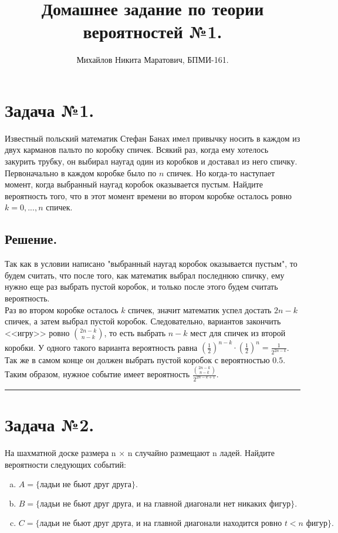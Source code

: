 \documentclass[a4paper, 12pt]{article}
\title{
	Домашнее задание по теории вероятностей №1.
}
\author{Михайлов Никита Маратович, БПМИ-161.
}
\date{}
\newcommand{\D}{\displaystyle}
\begin{document}
\maketitle
\begin{spacing}{1}
		
\section{Задача №1.} 
Известный польский математик Стефан Банах имел привычку носить в каждом из двух карманов пальто по коробку спичек. Всякий раз, когда ему хотелось закурить трубку, он выбирал наугад один из коробков и доставал из него спичку. Первоначально в каждом коробке было по $n$ спичек. Но когда-то наступает момент, когда выбранный наугад коробок оказывается пустым. Найдите вероятность того, что в этот момент времени во втором коробке осталось ровно $k = 0, . . . , n$ спичек.


\subsection{Решение.} Так как в условии написано "выбранный наугад коробок оказывается пустым", то будем считать, что после того, как математик выбрал последнюю спичку, ему нужно еще раз выбрать пустой коробок, и только после этого будем считать вероятность.\\
Раз во втором коробке осталось $k$ спичек, значит математик успел достать $2n - k$ спичек, а затем выбрал пустой коробок. Следовательно, вариантов закончить <<игру>> ровно $\binom{2n - k}{n - k}$, то есть выбрать $n - k$ мест для спичек из второй коробки. У одного такого варианта вероятность равна $\D \left(\frac{1}{2}\right)^{n - k}\cdot\left(\frac{1}{2}\right)^{n} = \frac{1}{2^{2n-k}}$. Так же в самом конце он должен выбрать пустой коробок с вероятностью $0.5$. Таким образом, нужное событие имеет вероятность $\D \frac{\binom{2n - k}{n - k}}{2^{2n-k+1}}$.\\
\hrule
\section{Задача №2.}
На шахматной доске размера n × n случайно размещают n ладей. Найдите вероятности следующих событий:
\begin{enumerate}[(a)]
	\item $A = \{\text{ладьи не бьют друг друга}\}.$
	\item $B = \{\text{ладьи не бьют друг друга, и на главной диагонали нет никаких фигур}\}.$
	\item $C = \{\text{ладьи не бьют друг друга, и на главной диагонали находится ровно } t < n \text{ фигур}\}.$
\end{enumerate}

\end{spacing}
\end{document}
